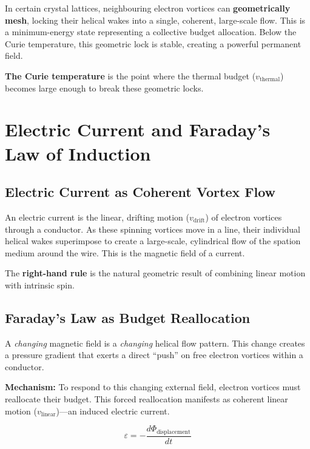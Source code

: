 In certain crystal lattices, neighbouring electron vortices can \textbf{geometrically mesh}, locking their helical wakes into a single, coherent, large-scale flow.  This is a minimum-energy state representing a collective budget allocation.  Below the Curie temperature, this geometric lock is stable, creating a powerful permanent field.

\textbf{The Curie temperature} is the point where the thermal budget ($v_{\text{thermal}}$) becomes large enough to break these geometric locks.


\section{Electric Current and Faraday's Law of Induction}

\subsection{Electric Current as Coherent Vortex Flow}

An electric current is the linear, drifting motion ($v_{\text{drift}}$) of electron vortices through a conductor.  As these spinning vortices move in a line, their individual helical wakes superimpose to create a large-scale, cylindrical flow of the spation medium around the wire.  This is the magnetic field of a current.

The \textbf{right-hand rule} is the natural geometric result of combining linear motion with intrinsic spin.

\subsection{Faraday's Law as Budget Reallocation}

A \emph{changing} magnetic field is a \emph{changing} helical flow pattern.  This change creates a pressure gradient that exerts a direct ``push'' on free electron vortices within a conductor.

\textbf{Mechanism:} To respond to this changing external field, electron vortices must reallocate their budget.  This forced reallocation manifests as coherent linear motion ($v_{\text{linear}}$)---an induced electric current.

\begin{equation}\label{eq:faraday}
  \boxed{\varepsilon = -\frac{d\Phi_{\text{displacement}}}{dt}}
\end{equation}

